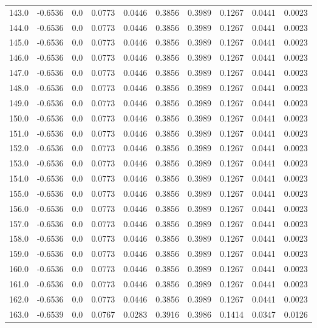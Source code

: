 \begin{longtable}{lrrrrrrrrr}
143.0 & -0.6536 & 0.0 & 0.0773 & 0.0446 & 0.3856 & 0.3989 & 0.1267 & 0.0441 & 0.0023 \\
144.0 & -0.6536 & 0.0 & 0.0773 & 0.0446 & 0.3856 & 0.3989 & 0.1267 & 0.0441 & 0.0023 \\
145.0 & -0.6536 & 0.0 & 0.0773 & 0.0446 & 0.3856 & 0.3989 & 0.1267 & 0.0441 & 0.0023 \\
146.0 & -0.6536 & 0.0 & 0.0773 & 0.0446 & 0.3856 & 0.3989 & 0.1267 & 0.0441 & 0.0023 \\
147.0 & -0.6536 & 0.0 & 0.0773 & 0.0446 & 0.3856 & 0.3989 & 0.1267 & 0.0441 & 0.0023 \\
148.0 & -0.6536 & 0.0 & 0.0773 & 0.0446 & 0.3856 & 0.3989 & 0.1267 & 0.0441 & 0.0023 \\
149.0 & -0.6536 & 0.0 & 0.0773 & 0.0446 & 0.3856 & 0.3989 & 0.1267 & 0.0441 & 0.0023 \\
150.0 & -0.6536 & 0.0 & 0.0773 & 0.0446 & 0.3856 & 0.3989 & 0.1267 & 0.0441 & 0.0023 \\
151.0 & -0.6536 & 0.0 & 0.0773 & 0.0446 & 0.3856 & 0.3989 & 0.1267 & 0.0441 & 0.0023 \\
152.0 & -0.6536 & 0.0 & 0.0773 & 0.0446 & 0.3856 & 0.3989 & 0.1267 & 0.0441 & 0.0023 \\
153.0 & -0.6536 & 0.0 & 0.0773 & 0.0446 & 0.3856 & 0.3989 & 0.1267 & 0.0441 & 0.0023 \\
154.0 & -0.6536 & 0.0 & 0.0773 & 0.0446 & 0.3856 & 0.3989 & 0.1267 & 0.0441 & 0.0023 \\
155.0 & -0.6536 & 0.0 & 0.0773 & 0.0446 & 0.3856 & 0.3989 & 0.1267 & 0.0441 & 0.0023 \\
156.0 & -0.6536 & 0.0 & 0.0773 & 0.0446 & 0.3856 & 0.3989 & 0.1267 & 0.0441 & 0.0023 \\
157.0 & -0.6536 & 0.0 & 0.0773 & 0.0446 & 0.3856 & 0.3989 & 0.1267 & 0.0441 & 0.0023 \\
158.0 & -0.6536 & 0.0 & 0.0773 & 0.0446 & 0.3856 & 0.3989 & 0.1267 & 0.0441 & 0.0023 \\
159.0 & -0.6536 & 0.0 & 0.0773 & 0.0446 & 0.3856 & 0.3989 & 0.1267 & 0.0441 & 0.0023 \\
160.0 & -0.6536 & 0.0 & 0.0773 & 0.0446 & 0.3856 & 0.3989 & 0.1267 & 0.0441 & 0.0023 \\
161.0 & -0.6536 & 0.0 & 0.0773 & 0.0446 & 0.3856 & 0.3989 & 0.1267 & 0.0441 & 0.0023 \\
162.0 & -0.6536 & 0.0 & 0.0773 & 0.0446 & 0.3856 & 0.3989 & 0.1267 & 0.0441 & 0.0023 \\
163.0 & -0.6539 & 0.0 & 0.0767 & 0.0283 & 0.3916 & 0.3986 & 0.1414 & 0.0347 & 0.0126 \\

\end{longtable}
